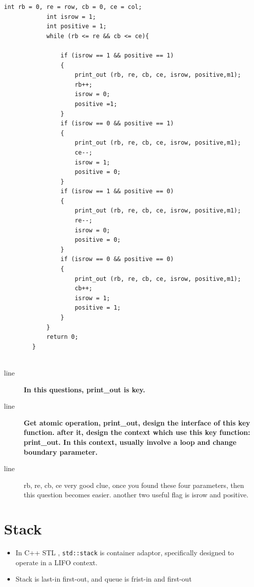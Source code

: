 \documentclass[a4paper,11pt,twoside]{book}
\begin{document}
\begin{itemize}
\begin{lstlisting}[numbers=none]
			int rb = 0, re = row, cb = 0, ce = col;
			int isrow = 1;
			int positive = 1;
			while (rb <= re && cb <= ce){
				
				if (isrow == 1 && positive == 1)
				{
					print_out (rb, re, cb, ce, isrow, positive,m1);
					rb++;
					isrow = 0;
					positive =1;
				}
				if (isrow == 0 && positive == 1)
				{
					print_out (rb, re, cb, ce, isrow, positive,m1);
					ce--;
					isrow = 1;
					positive = 0;
				}
				if (isrow == 1 && positive == 0)
				{
					print_out (rb, re, cb, ce, isrow, positive,m1);
					re--;
					isrow = 0;
					positive = 0;
				}
				if (isrow == 0 && positive == 0)
				{
					print_out (rb, re, cb, ce, isrow, positive,m1);
					cb++;
					isrow = 1;
					positive = 1;
				}
			}
			return 0;
		}	
		
	\end{lstlisting}		
	
	\begin{description}
		\item[line ] \textbf{In this questions, print\_out is key. }
		\item[line ] \textbf{Get atomic operation, print\_out, design the interface of this key function. after it, design the context which use this key function: print\_out. In this context, usually involve a loop and change boundary parameter.}
		
		\item[line ] rb, re, cb, ce very good clue, once you found these four parameters, then this question becomes easier. another two useful flag is isrow and positive. 
	\end{description}
\end{itemize}

 
\section{Stack}
\begin{itemize}
	\item In C++ STL , \texttt{std::stack} is container adaptor, specifically designed to operate in a LIFO context. 

	\item Stack is last-in first-out, and queue is frist-in and first-out
\end{itemize}
\end{document}
